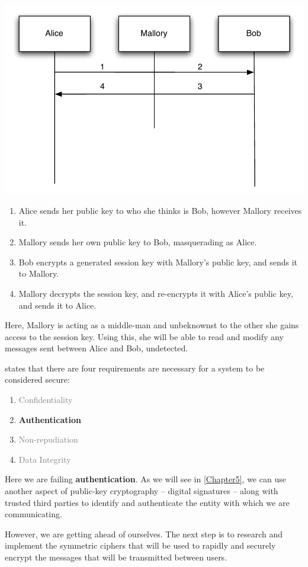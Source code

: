 \begin{center}
  \includegraphics[scale=0.6]{./Figures/3-7-1.pdf}
\end{center}

\begin{enumerate}
  \item Alice sends her public key to who she thinks is Bob, however Mallory receives it.
  \item Mallory sends her own public key to Bob, masquerading as Alice.
  \item Bob encrypts a generated session key with Mallory's public key, and sends it to Mallory.
  \item Mallory decrypts the session key, and re-encrypts it with Alice's public key, and sends it to Alice.
\end{enumerate}

Here, Mallory is acting as a middle-man and unbeknownst to the other she gains access to the session key. Using this, she will be able to read and modify any messages sent between Alice and Bob, undetected.

 states that there are four requirements are necessary for a system to be considered secure:

\begin{enumerate}
	\item \textcolor{gray}{Confidentiality}
	\item \textbf{Authentication}
	\item \textcolor{gray}{Non-repudiation}
	\item \textcolor{gray}{Data Integrity}
\end{enumerate}

Here we are failing \textbf{authentication}. As we will see in \textsection\ref{Chapter5}, we can use another aspect of public-key cryptography -- digital signatures -- along with trusted third parties to identify and authenticate the entity with which we are communicating.

However, we are getting ahead of ourselves. The next step is to research and implement the symmetric ciphers that will be used to rapidly and securely encrypt the messages that will be transmitted between users.
